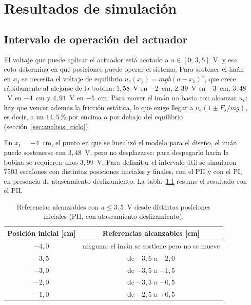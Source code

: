\chapter{Resultados de simulación}
\label{chap:resultados}

\section{Intervalo de operación del actuador}
\label{sec:intervalo}

El voltaje que puede aplicar el actuador está acotado a $u\in[0;\,3{,}5]$~V, y esa cota determina en qué posiciones puede operar el sistema. Para sostener el imán en $x_1$ se necesita el voltaje de equilibrio $u_e(x_1)=mgb(a-x_1)^4$, que crece rápidamente al alejarse de la bobina: $1{,}58$~V en $-2$~cm, $2{,}39$~V en $-3$~cm, $3{,}48$~V en $-4$~cm y $4{,}91$~V en $-5$~cm. Para mover el imán no basta con alcanzar $u_e$: hay que vencer además la fricción estática, lo que exige llegar a $u_e(1\pm F_s/mg)$, es decir, a un $14{,}5$\,\% por encima o por debajo del equilibrio (sección~\ref{sec:analisis_ciclo}).

En $x_1=-4$~cm, el punto en que se linealizó el modelo para el diseño, el imán puede sostenerse con $3{,}48$~V, pero no desplazarse: para despegarlo hacia la bobina se requieren unos $3{,}99$~V. Para delimitar el intervalo útil se simularon 7503 escalones con distintas posiciones iniciales y finales, con el PII y con el PI, en presencia de atascamiento-deslizamiento. La tabla~\ref{tab:intervalo} resume el resultado con el PII.

\begin{table}[ht]
\centering
\caption{Referencias alcanzables con $u\le3{,}5$~V desde distintas posiciones iniciales (PII, con atascamiento-deslizamiento).}
\label{tab:intervalo}
\begin{tabular}{|c|c|}
\hline
Posición inicial [cm] & Referencias alcanzables [cm] \\ \hline
$-4{,}0$ & ninguna: el imán se sostiene pero no se mueve \\ \hline
$-3{,}5$ & de $-3{,}6$ a $-2{,}0$ \\ \hline
$-3{,}0$ & de $-3{,}5$ a $-1{,}5$ \\ \hline
$-2{,}0$ & de $-3{,}3$ a $-0{,}5$ \\ \hline
$-1{,}0$ & de $-2{,}5$ a $+0{,}5$ \\ \hline
\end{tabular}
\end{table}


